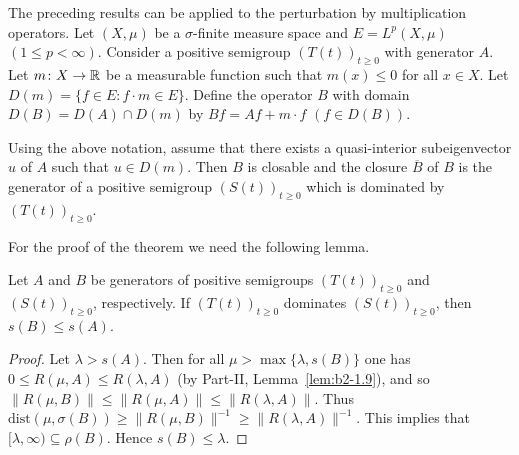 The preceding results can be applied to the perturbation by multiplication operators. 
Let $(X,\mu)$ be a $\sigma$-finite measure space and $E = L^{p}(X,\mu)$ $(1 \leq p < \infty)$. 
Consider a positive semigroup $(T(t))_{t \geq 0}$ with generator $A$. 
Let $m \colon X \to \mathbb{R}$ be a measurable function such that $m(x) \leq 0$ for all $x \in X$. 
Let $D(m) = \{f \in E \colon f \cdot m \in E\}$. 
Define the operator $B$ with domain $D(B) = D(A) \cap D(m)$ by $Bf = Af + m \cdot f$ $(f \in D(B))$. 
\begin{theorem}\label{thm:c2-4.9}
Using the above notation, assume that there exists a quasi-interior subeigenvector $u$ of\/ $A$
such that $u \in D(m)$. Then $B$ is closable and the closure $\overline{B}$ of\/ $B$ is the generator of a positive semigroup $(S(t))_{t \geq 0}$ which is dominated by $(T(t))_{t \geq 0}$.
\end{theorem}
For the proof of the theorem we need the following lemma.
\begin{lemma}\label{lem:c2-4.10}
Let $A$ and $B$ be generators of positive semigroups
$(T(t))_{t \geq 0}$ and $(S(t))_{t \geq 0}$, respectively.
If\/ $(T(t))_{t \geq 0}$ dominates
$(S(t))_{t \geq 0}$, then $s(B) \leq s(A)$.
\end{lemma}
\begin{proof}%
Let $\lambda > s(A)$.
Then for all $\mu > \max \{\lambda,s(B)\}$ one has $0 \leq R(\mu,A) \leq R(\lambda,A)$ 
(by Part-II, Lemma~\ref{lem:b2-1.9}), and so $\|R(\mu,B)\| \leq  \|R(\mu,A)\| \leq \|R(\lambda,A)\|$.
Thus $\text{dist}(\mu,\sigma(B)) \geq \|R(\mu,B)\|^{-1} \geq \|R(\lambda,A)\|^{-1}$.
This implies that $[\lambda,\infty) \subseteq \rho(B)$.
Hence $s(B) \leq \lambda$.
\end{proof}
